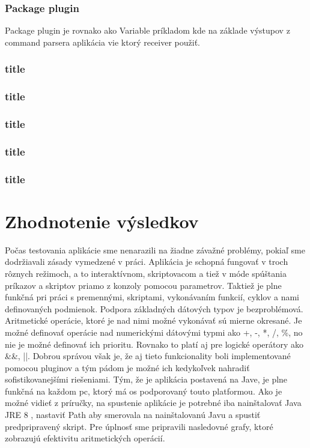 \subsubsection{Package plugin}
\indent Package plugin je rovnako ako Variable príkladom kde na základe výstupov z command parsera aplikácia vie ktorý receiver použiť. 
\subsubsection{title}
\subsubsection{title}
\subsubsection{title}
\subsubsection{title}
\subsubsection{title}
\section{Zhodnotenie výsledkov}
\indent Počas testovania aplikácie sme nenarazili na žiadne závažné problémy, pokiaľ sme dodržiavali zásady vymedzené v práci. 
\newline
\indent Aplikácia je schopná fungovať v troch rôznych režimoch, a to interaktívnom, skriptovacom a tiež v móde spúštania príkazov a skriptov priamo z konzoly pomocou parametrov. Taktiež je plne funkčná pri práci s premennými, skriptami, vykonávaním funkcií, cyklov a nami definovaných podmienok.
\newline
\indent  Podpora základných dátových typov je bezproblémová. Aritmetické operácie, ktoré je nad nimi možné vykonávať sú mierne okresané. Je možné definovať  operácie nad numerickými dátovými typmi ako +, -, *, /, \%, no nie je možné definovať ich prioritu. Rovnako to platí aj pre logické operátory ako \&\&, ||. Dobrou správou však je, že aj tieto funkcionality boli implementované pomocou pluginov a tým pádom je možné ich kedykoľvek nahradiť sofistikovanejšími riešeniami. 
\newline
\indent Tým, že je aplikácia postavená na Jave, je plne funkčná na každom \acrshort{pc}, ktorý má \acrshort{os} podporovaný touto platformou. Ako je možné vidieť z príručky, na spustenie aplikácie je potrebné iba nainštalovať Java JRE 8 , nastaviť Path aby smerovala na nainštalovanú Javu a spustiť predpripravený skript. Pre úplnosť sme pripravili nasledovné grafy, ktoré zobrazujú efektivitu aritmetických operácií.
